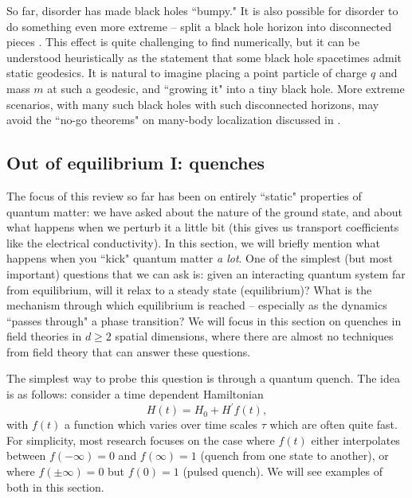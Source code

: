 \documentclass[10pt, oneside]{book}
\begin{document}
\begin{doublespace}
So far, disorder has made black holes ``bumpy."   It is also possible for disorder to do something even more extreme -- split a black hole horizon into disconnected pieces  \cite{Horowitz:2014gva}.   This effect is quite challenging to find numerically, but it can be understood heuristically as the statement that some black hole spacetimes admit static geodesics.   It is natural to imagine placing a point particle of charge $q$ and mass $m$ at such a geodesic, and ``growing it" into a tiny black hole.   More extreme scenarios, with many such black holes with such disconnected horizons, may avoid the ``no-go theorems" on many-body localization discussed in \cite{Grozdanov:2015qia, Grozdanov2}.   

\subsection{Out of equilibrium I:  quenches}
The focus of this review so far has been on entirely ``static" properties of quantum matter:  we have asked about the nature of the ground state, and about what happens when we perturb it a little bit (this gives us transport coefficients like the electrical conductivity).   In this section, we will briefly mention what happens when you ``kick" quantum matter \emph{a lot}.   One of the simplest (but most important) questions that we can ask is:  given an interacting quantum system far from equilibrium, will it relax to a steady state (equilibrium)?   What is the mechanism through which equilibrium is reached -- especially as the dynamics ``passes through" a phase transition?    We will focus in this section on quenches in field theories in $d\ge 2$ spatial dimensions,  where there are almost no techniques from field theory that can answer these questions.

The simplest way to probe this question is through a quantum quench.   The idea is as follows:  consider a time dependent Hamiltonian \begin{equation}
H(t) = H_0 + H^\prime f(t),
\end{equation}
with $f(t)$ a function which varies over time scales $\tau$ which are often quite fast.   For simplicity, most research focuses on the case where $f(t)$ either interpolates between $f(-\infty)=0$ and $f(\infty)=1$  (quench from one state to another),   or where $f(\pm \infty)=0$ but $f(0)=1$  (pulsed quench).   We will see examples of both in this section.


\end{doublespace}
\end{document}

